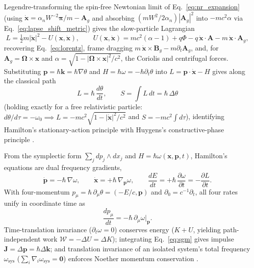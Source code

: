 \documentclass[aps,prd,onecolumn,tightenlines,nofootinbib,notitlepage,10pt,floatfix]{revtex4-2}
\theoremstyle{indentedtheorem}
\begin{document}
Legendre-transforming the spin-free Newtonian limit of Eq.~\eqref{eq:nr_expansion} (using $\dot{\mathbf{x}}=\alpha_n W^{-2}\boldsymbol{\pi}/m-\mathbf{A}_g$ and absorbing $(mW^2/2\alpha_n)|\mathbf{A}_g|^2$ into $-mc^2\alpha$ via Eq.~\eqref{eq:lapse_shift_metric}) gives the slow-particle Lagrangian
\begin{equation}
    L = \tfrac{1}{2}m|\dot{\mathbf{x}}|^2 - U(\mathbf{x},\dot{\mathbf{x}}) , \qquad U(\mathbf{x},\dot{\mathbf{x}}) = mc^2(\alpha-1) + q\Phi - q\,\dot{\mathbf{x}}\cdot\mathbf{A} - m\,\dot{\mathbf{x}}\cdot\mathbf{A}_g ,
    \label{eq:sgm_lagrangian}
\end{equation}
recovering Eq.~\eqref{eq:lorentz}, frame dragging $m\,\dot{\mathbf{x}}\times\mathbf{B}_g-m\partial_t\mathbf{A}_g$, and, for $\mathbf{A}_g=\boldsymbol{\Omega}\times\mathbf{x}$ and $\alpha=\sqrt{1-|\boldsymbol{\Omega}\times\mathbf{x}|^2/c^2}$, the Coriolis and centrifugal forces. Substituting $\mathbf{p}=\hbar\mathbf{k}=\hbar\nabla\theta$ and $H=\hbar\omega=-\hbar\partial_t\theta$ into $L=\mathbf{p}\cdot\dot{\mathbf{x}}-H$ gives along the classical path
\begin{equation}
    L = \hbar\,\frac{d\theta}{dt} , \qquad S = \int L\,dt = \hbar\,\Delta\theta
    \label{eq:action_phase}
\end{equation}
(holding exactly for a free relativistic particle: $d\theta/d\tau=-\omega_0\implies L=-mc^2\sqrt{1-|\dot{\mathbf{x}}|^2/c^2}$ and $S=-mc^2\int d\tau$), identifying Hamilton's stationary-action principle with Huygens's constructive-phase principle \citep{Huygens1690Traite,Schrodinger1926Quantization}.

From the symplectic form $\sum_j dp_j\wedge dx_j$ and $H=\hbar\omega(\mathbf{x},\mathbf{p},t)$, Hamilton's equations are dual frequency gradients,
\begin{equation}
    \dot{\mathbf{p}} = -\hbar\,\nabla\omega , \qquad \dot{\mathbf{x}} = +\hbar\,\nabla_{\mathbf{p}}\omega , \qquad \frac{dE}{dt} = +\hbar\,\frac{\partial\omega}{\partial t} = -\frac{\partial L}{\partial t} .
    \label{eq:ham_dual}
\end{equation}
With four-momentum $p_\mu=\hbar\,\partial_\mu\theta=(-E/c,\mathbf{p})$ and $\partial_0=c^{-1}\partial_t$, all four rates unify in coordinate time as
\begin{equation}
    \frac{dp_\mu}{dt} = -\hbar\,\partial_\mu\omega\big|_{\mathbf{p}} .
    \label{eq:sgm_fourvector}
\end{equation}
Time-translation invariance ($\partial_t\omega=0$) conserves energy ($K+U$, yielding path-independent work $\mathcal{W}=-\Delta U=\Delta K$); integrating Eq.~\eqref{eq:sgm} gives impulse $\mathbf{J}=\Delta\mathbf{p}=\hbar\Delta\mathbf{k}$; and translation invariance of an isolated system's total frequency $\omega_\text{sys}$ ($\sum_i\nabla_i\omega_\text{sys}=\mathbf{0}$) enforces Noether momentum conservation \citep{Noether1918Invariante,Goldstein2002Classical}.
\end{document}
